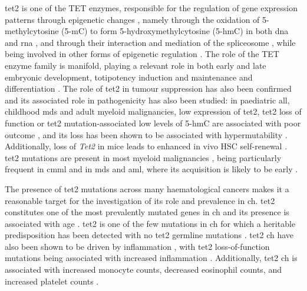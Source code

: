\Ac{tet2} is one of the TET enzymes, responsible for the regulation of gene expression patterns through epigenetic changes \cite{Rasmussen2016-rt}, namely through the oxidation of 5-methylcytosine (5-mC) to form 5-hydroxymethylcytosine (5-hmC) in both \ac{dna} \cite{Tahiliani2009-gj,Ito2010-el,Guallar2018-eg} and \ac{rna} \cite{He2016-nm,Fu2014-kw}, and through their interaction and mediation of the spliceosome \cite{Rappsilber2002-ll,Tan2009-vw}, while being involved in other forms of epigenetic regulation \cite{Yang2020-yb}. The role of the TET enzyme family is manifold, playing a relevant role in both early and late embryonic development, totipotency induction and maintenance and differentiation \cite{Yang2020-yb}. The role of \ac{tet2} in tumour suppression has also been confirmed \cite{Wang2015-ih} and its associated role in pathogenicity has also been studied: in paediatric \ac{all}, childhood \ac{mds} and adult myeloid malignancies, low expression of \ac{tet2}, \ac{tet2} loss of function or \ac{tet2} mutation-associated low levels of 5-hmC are associated with poor outcome \cite{Zhang2019-on,Coutinho2015-pb,Liu2013-rf}, and its loss has been shown to be associated with hypermutability \cite{Pan2017-ic}. Additionally, loss of \textit{Tet2} in mice leads to enhanced in vivo HSC self-renewal \cite{Moran-Crusio2011-rm}. \ac{tet2} mutations are present in most myeloid malignancies \cite{Delhommeau2009-xp,Abdel-Wahab2009-ir}, being particularly frequent in \ac{cmml} \cite{Abdel-Wahab2009-ir} and in \ac{mds} and \ac{aml}, where its acquisition is likely to be early \cite{Langemeijer2009-ll,Welch2012-uq,Shlush2014-di}.

The presence of \ac{tet2} mutations across many haematological cancers makes it a reasonable target for the investigation of its role and prevalence in \ac{ch}. \Ac{tet2} constitutes one of the most prevalently mutated genes in \ac{ch} \cite{Jaiswal2014-rl,Bolton2020-ct,Genovese2014-eu,Zehir2017-gh,Xie2014-np,Zink2017-zi} and its presence is associated with age \cite{Xie2014-np}. \Ac{tet2} is one of the few mutations in \ac{ch} for which a heritable predisposition has been detected with no \ac{tet2} germline mutations \cite{Buscarlet2017-vh,Bick2020-gk}. \ac{tet2} \ac{ch} have also been shown to be driven by inflammation \cite{Zhang2019-wb,Cai2018-yi}, with \ac{tet2} loss-of-function mutations being associated with increased inflammation \cite{Zhang2015-wy,Cai2018-yi}. Additionally, \ac{tet2} \ac{ch} is associated with increased monocyte counts, decreased eosinophil counts, and increased platelet counts \cite{Buscarlet2017-vh,Dawoud2020-af}. 

